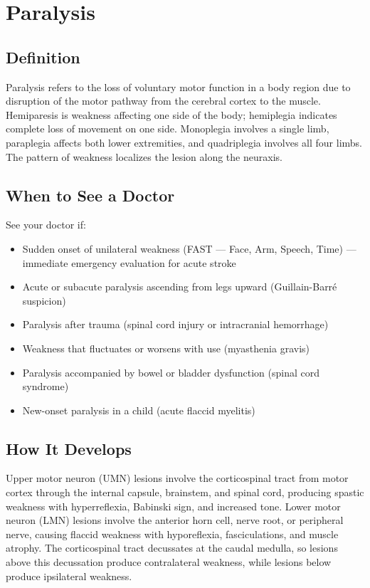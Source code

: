 \chapter{Paralysis}

\section*{Definition}
Paralysis refers to the loss of voluntary motor function in a body region due to disruption of the motor pathway from the cerebral cortex to the muscle. Hemiparesis is weakness affecting one side of the body; hemiplegia indicates complete loss of movement on one side. Monoplegia involves a single limb, paraplegia affects both lower extremities, and quadriplegia involves all four limbs. The pattern of weakness localizes the lesion along the neuraxis.

\section*{When to See a Doctor}
See your doctor if:
\begin{itemize}
  \item Sudden onset of unilateral weakness (FAST --- Face, Arm, Speech, Time) --- immediate emergency evaluation for acute stroke
  \item Acute or subacute paralysis ascending from legs upward (Guillain-Barr\'e suspicion)
  \item Paralysis after trauma (spinal cord injury or intracranial hemorrhage)
  \item Weakness that fluctuates or worsens with use (myasthenia gravis)
  \item Paralysis accompanied by bowel or bladder dysfunction (spinal cord syndrome)
  \item New-onset paralysis in a child (acute flaccid myelitis)
\end{itemize}

\section*{How It Develops}
Upper motor neuron (UMN) lesions involve the corticospinal tract from motor cortex through the internal capsule, brainstem, and spinal cord, producing spastic weakness with hyperreflexia, Babinski sign, and increased tone. Lower motor neuron (LMN) lesions involve the anterior horn cell, nerve root, or peripheral nerve, causing flaccid weakness with hyporeflexia, fasciculations, and muscle atrophy. The corticospinal tract decussates at the caudal medulla, so lesions above this decussation produce contralateral weakness, while lesions below produce ipsilateral weakness.

